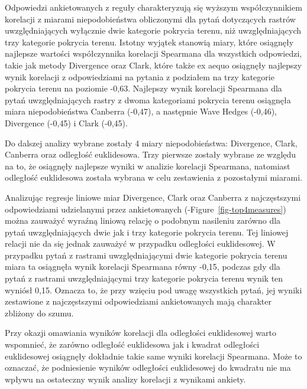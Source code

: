 \documentclass{amuthesis}
\begin{document}
Odpowiedzi ankietowanych z reguły charakteryzują się wyższym
współczynnikiem korelacji z miarami niepodobieństwa obliczonymi dla
pytań dotyczących rastrów uwzględniających wyłącznie dwie kategorie
pokrycia terenu, niż uwzględniających trzy kategorie pokrycia terenu.
Istotny wyjątek stanowią miary, które osiągnęły najlepsze wartości
współczynnika korelacji Spearmana dla wszystkich odpowiedzi, takie jak
metody Divergence oraz Clark, które także ex aequo osiągnęły najlepszy
wynik korelacji z odpowiedziami na pytania z podziałem na trzy kategorie
pokrycia terenu na poziomie -0,63. Najlepszy wynik korelacji Spearmana
dla pytań uwzględniających rastry z dwoma kategoriami pokrycia terenu
osiągnęła miara niepodobieństwa Canberra (-0,47), a następnie Wave
Hedges (-0,46), Divergence (-0,45) i Clark (-0,45).

Do dalszej analizy wybrane zostały 4 miary niepodobieństwa: Divergence,
Clark, Canberra oraz odległość euklidesowa. Trzy pierwsze zostały
wybrane ze względu na to, że osiągnęły najlepsze wyniki w analizie
korelacji Spearmana, natomiast odległość euklidesowa została wybrana w
celu zestawienia z pozostałymi miarami.

Analizując regresje liniowe miar Divergence, Clark oraz Canberra z
najczęstszymi odpowiedziami udzielanymi przez ankietowanych
(-Figure~\ref{fig-top4measures}) można zauważyć wyraźną liniową relację
o podobnym nasileniu zarówno dla pytań uwzględniających dwie jak i trzy
kategorie pokrycia terenu. Tej liniowej relacji nie da się jednak
zauważyć w przypadku odległości euklidesowej. W przypadku pytań z
rastrami uwzględniającymi dwie kategorie pokrycia terenu miara ta
osiągnęła wynik korelacji Spearmana równy -0,15, podczas gdy dla pytań z
rastrami uwzględniającymi trzy kategorie pokrycia terenu wynik ten
wyniósł 0,15. Oznacza to, że przy wzięciu pod uwagę wszystkich pytań,
jej wyniki zestawione z najczęstszymi odpowiedziami ankietowanych mają
charakter zbliżony do szumu.

Przy okazji omawiania wyników korelacji dla odległości euklidesowej
warto wspomnieć, że zarówno odległość euklidesowa jak i kwadrat
odległości euklidesowej osiągnęły dokładnie takie same wyniki korelacji
Spearmana. Może to oznaczać, że podniesienie wyników odległości
euklidesowej do kwadratu nie ma wpływu na ostateczny wynik analizy
korelacji z wynikami ankiety.
\end{document}
